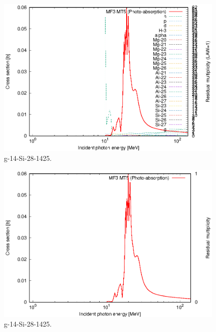 \begin{figure}
 \includegraphics[width=\linewidth]{eps/g_14-Si-28_1425.eps}
  \caption{g-14-Si-28-1425.}
\end{figure}
\begin{figure}
 \includegraphics[width=\linewidth]{eps-law0/g_14-Si-28_1425.eps}
 \caption{g-14-Si-28-1425.}
\end{figure}
\newpage \clearpage

